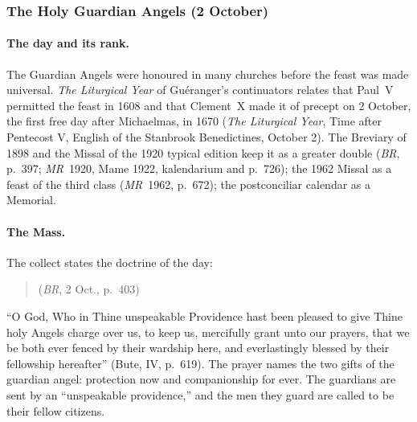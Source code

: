\subsubsection{The Holy Guardian Angels (2 October)}

\paragraph{The day and its rank.} The Guardian Angels were honoured in
many churches before the feast was made universal. \emph{The Liturgical
Year} of Guéranger's continuators relates that Paul~V permitted the feast
in 1608 and that Clement~X made it of precept on 2 October, the first
free day after Michaelmas, in 1670 (\emph{The Liturgical Year}, Time after
Pentecost V, English of the Stanbrook Benedictines, October 2). The
Breviary of 1898 and the Missal of the 1920 typical edition keep it as a
greater double (\emph{BR}, p.~397; \emph{MR}~1920, Mame 1922, kalendarium
and p.~726); the 1962 Missal as a feast of the
third class (\emph{MR}~1962, p.~672); the postconciliar calendar as a
Memorial.

\paragraph{The Mass.} The collect states the doctrine of the day:
\begin{quote}
(\emph{BR}, 2 Oct., p.~403)
\end{quote}
``O God, Who in Thine unspeakable Providence hast been pleased to give
Thine holy Angels charge over us, to keep us, mercifully grant unto our
prayers, that we be both ever fenced by their wardship here, and
everlastingly blessed by their fellowship hereafter'' (Bute, IV, p.~619).
The prayer names the two gifts of the guardian angel: protection now and
companionship for ever. The guardians are sent by an ``unspeakable
providence,'' and the men they guard are called to be their fellow
citizens.

